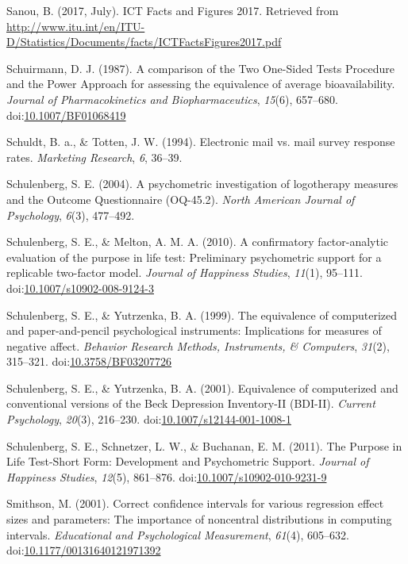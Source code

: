 \documentclass[english,man, mask]{apa6}
\theoremstyle{definition}
\theoremstyle{definition}
\theoremstyle{definition}
\theoremstyle{remark}
\begin{document}
\hypertarget{ref-Sanou2017}{}
Sanou, B. (2017, July). ICT Facts and Figures 2017. Retrieved from
\url{http://www.itu.int/en/ITU-D/Statistics/Documents/facts/ICTFactsFigures2017.pdf}

\hypertarget{ref-Schuirmann1987}{}
Schuirmann, D. J. (1987). A comparison of the Two One-Sided Tests
Procedure and the Power Approach for assessing the equivalence of
average bioavailability. \emph{Journal of Pharmacokinetics and
Biopharmaceutics}, \emph{15}(6), 657--680.
doi:\href{https://doi.org/10.1007/BF01068419}{10.1007/BF01068419}

\hypertarget{ref-Schuldt1994}{}
Schuldt, B. a., \& Totten, J. W. (1994). Electronic mail vs. mail survey
response rates. \emph{Marketing Research}, \emph{6}, 36--39.

\hypertarget{ref-Schulenberg2004}{}
Schulenberg, S. E. (2004). A psychometric investigation of logotherapy
measures and the Outcome Questionnaire (OQ-45.2). \emph{North American
Journal of Psychology}, \emph{6}(3), 477--492.

\hypertarget{ref-Schulenberg2010}{}
Schulenberg, S. E., \& Melton, A. M. A. (2010). A confirmatory
factor-analytic evaluation of the purpose in life test: Preliminary
psychometric support for a replicable two-factor model. \emph{Journal of
Happiness Studies}, \emph{11}(1), 95--111.
doi:\href{https://doi.org/10.1007/s10902-008-9124-3}{10.1007/s10902-008-9124-3}

\hypertarget{ref-Schulenberg1999}{}
Schulenberg, S. E., \& Yutrzenka, B. A. (1999). The equivalence of
computerized and paper-and-pencil psychological instruments:
Implications for measures of negative affect. \emph{Behavior Research
Methods, Instruments, \& Computers}, \emph{31}(2), 315--321.
doi:\href{https://doi.org/10.3758/BF03207726}{10.3758/BF03207726}

\hypertarget{ref-Schulenberg2001}{}
Schulenberg, S. E., \& Yutrzenka, B. A. (2001). Equivalence of
computerized and conventional versions of the Beck Depression
Inventory-II (BDI-II). \emph{Current Psychology}, \emph{20}(3),
216--230.
doi:\href{https://doi.org/10.1007/s12144-001-1008-1}{10.1007/s12144-001-1008-1}

\hypertarget{ref-Schulenberg2011}{}
Schulenberg, S. E., Schnetzer, L. W., \& Buchanan, E. M. (2011). The
Purpose in Life Test-Short Form: Development and Psychometric Support.
\emph{Journal of Happiness Studies}, \emph{12}(5), 861--876.
doi:\href{https://doi.org/10.1007/s10902-010-9231-9}{10.1007/s10902-010-9231-9}

\hypertarget{ref-Smithson2001}{}
Smithson, M. (2001). Correct confidence intervals for various regression
effect sizes and parameters: The importance of noncentral distributions
in computing intervals. \emph{Educational and Psychological
Measurement}, \emph{61}(4), 605--632.
doi:\href{https://doi.org/10.1177/00131640121971392}{10.1177/00131640121971392}
\end{document}
